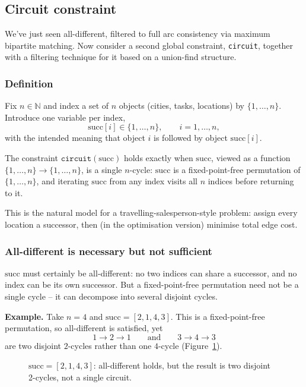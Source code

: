 \documentclass[11pt]{article}
\begin{document}
\subsection{Circuit constraint}

We've just seen all-different, filtered to full arc consistency via maximum bipartite matching. Now consider a second global constraint, \texttt{circuit}, together with a filtering technique for it based on a union-find structure.

\subsubsection{Definition}

Fix $n \in \mathbb{N}$ and index a set of $n$ objects (cities, tasks, locations) by $\{1,\dots,n\}$. Introduce one variable per index,
\[
    \text{succ}[i] \in \{1,\dots,n\}, \qquad i = 1,\dots,n,
\]
with the intended meaning that object $i$ is followed by object $\text{succ}[i]$.

The constraint $\texttt{circuit}(\text{succ})$ holds exactly when $\text{succ}$, viewed as a function $\{1,\dots,n\}\to\{1,\dots,n\}$, is a single $n$-cycle: $\text{succ}$ is a fixed-point-free permutation of $\{1,\dots,n\}$, and iterating $\text{succ}$ from any index visits all $n$ indices before returning to it.

This is the natural model for a travelling-salesperson-style problem: assign every location a successor, then (in the optimisation version) minimise total edge cost.

\subsubsection{All-different is necessary but not sufficient}

$\text{succ}$ must certainly be all-different: no two indices can share a successor, and no index can be its own successor. But a fixed-point-free permutation need not be a single cycle -- it can decompose into several disjoint cycles.

\textbf{Example.} Take $n = 4$ and $\text{succ} = [2, 1, 4, 3]$. This is a fixed-point-free permutation, so all-different is satisfied, yet
\[
    1 \to 2 \to 1 \qquad \text{and} \qquad 3 \to 4 \to 3
\]
are two disjoint $2$-cycles rather than one $4$-cycle (Figure~\ref{fig:subtour}).

\begin{figure}[H]
    \centering
    \caption{$\text{succ}=[2,1,4,3]$: all-different holds, but the result is two disjoint 2-cycles, not a single circuit.}
    \label{fig:subtour}
\end{figure}
\end{document}
